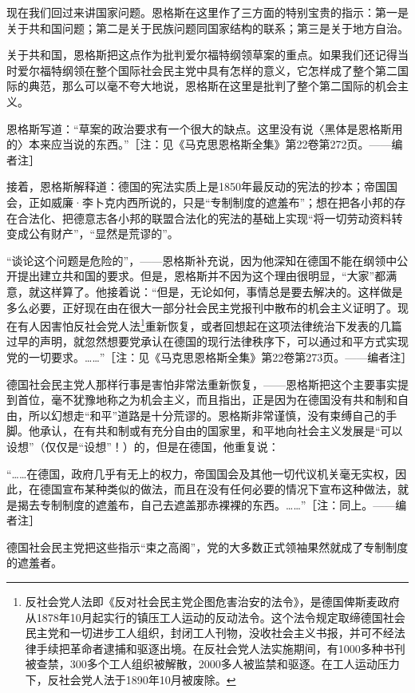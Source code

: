 \documentclass[UTF8, 12pt, a4paper]{ctexrep}
\begin{document}
现在我们回过来讲国家问题。恩格斯在这里作了三方面的特别宝贵的指示：第一是关于共和国问题；第二是关于民族问题同国家结构的联系；第三是关于地方自治。

关于共和国，恩格斯把这点作为批判爱尔福特纲领草案的重点。如果我们还记得当时爱尔福特纲领在整个国际社会民主党中具有怎样的意义，它怎样成了整个第二国际的典范，那么可以毫不夸大地说，恩格斯在这里是批判了整个第二国际的机会主义。

恩格斯写道：“草案的政治要求有一个很大的缺点。这里没有说〈黑体是恩格斯用的〉本来应当说的东西。”［注：见《马克思恩格斯全集》第22卷第272页。——编者注］

接着，恩格斯解释道：德国的宪法实质上是1850年最反动的宪法的抄本；帝国国会，正如威廉·李卜克内西所说的，只是“专制制度的遮羞布”；想在把各小邦的存在合法化、把德意志各小邦的联盟合法化的宪法的基础上实现“将一切劳动资料转变成公有财产”，“显然是荒谬的”。

“谈论这个问题是危险的”，——恩格斯补充说，因为他深知在德国不能在纲领中公开提出建立共和国的要求。但是，恩格斯并不因为这个理由很明显，“大家”都满意，就这样算了。他接着说：“但是，无论如何，事情总是要去解决的。这样做是多么必要，正好现在由在很大一部分社会民主党报刊中散布的机会主义证明了。现在有人因害怕反社会党人法\footnote{反社会党人法即《反对社会民主党企图危害治安的法令》，是德国俾斯麦政府从1878年10月起实行的镇压工人运动的反动法令。这个法令规定取缔德国社会民主党和一切进步工人组织，封闭工人刊物，没收社会主义书报，并可不经法律手续把革命者逮捕和驱逐出境。在反社会党人法实施期间，有1000多种书刊被查禁，300多个工人组织被解散，2000多人被监禁和驱逐。在工人运动压力下，反社会党人法于1890年10月被废除。}重新恢复，或者回想起在这项法律统治下发表的几篇过早的声明，就忽然想要党承认在德国的现行法律秩序下，可以通过和平方式实现党的一切要求。……”［注：见《马克思恩格斯全集》第22卷第273页。——编者注］

德国社会民主党人那样行事是害怕非常法重新恢复，——恩格斯把这个主要事实提到首位，毫不犹豫地称之为机会主义，而且指出，正是因为在德国没有共和制和自由，所以幻想走“和平”道路是十分荒谬的。恩格斯非常谨慎，没有束缚自己的手脚。他承认，在有共和制或有充分自由的国家里，和平地向社会主义发展是“可以设想”（仅仅是“设想”！）的，但是在德国，他重复说：

“……在德国，政府几乎有无上的权力，帝国国会及其他一切代议机关毫无实权，因此，在德国宣布某种类似的做法，而且在没有任何必要的情况下宣布这种做法，就是揭去专制制度的遮羞布，自己去遮盖那赤裸裸的东西。……”［注：同上。——编者注］

德国社会民主党把这些指示“束之高阁”，党的大多数正式领袖果然就成了专制制度的遮羞者。
\end{document}
